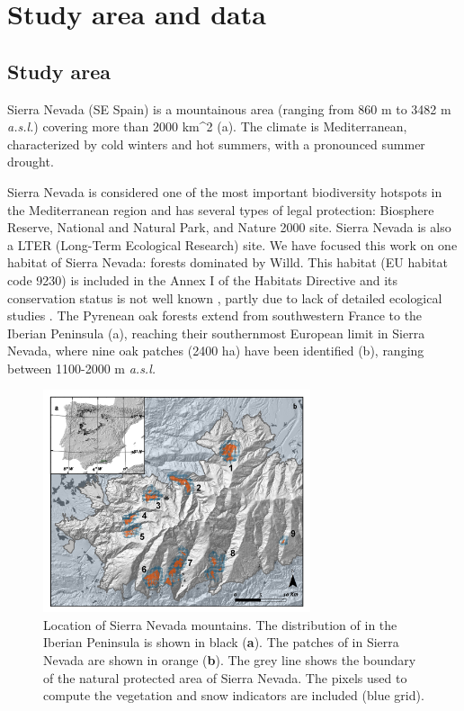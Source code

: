 \section{Study area and data}\label{sec:onto:MatMet}
\subsection{Study area}\label{sec:onto:StudyArea}

Sierra Nevada (SE Spain) is a mountainous area (ranging from 860 m to 3482 m \emph{a.s.l.}) covering more than 2000 km\^{}2 (a). The climate is Mediterranean, characterized by cold winters and hot summers, with a pronounced summer drought.

Sierra Nevada is considered one of the most important biodiversity hotspots in the Mediterranean region \autocite{Blancaetal1998ThreatenedVascular} and has several types of legal protection: Biosphere Reserve, National and Natural Park, and Nature 2000 site. Sierra Nevada is also a LTER (Long-Term Ecological Research) site.
We have focused this work on one habitat of Sierra Nevada: forests dominated by \Qpy Willd. This habitat (EU habitat code 9230) is included in the Annex I of the Habitats Directive and its conservation status is not well known \autocite{EIONET2013OnlineReport}, partly due to lack of detailed ecological studies \autocite{GarciaJimenez20099230Robledales}. The Pyrenean oak forests extend from southwestern France to the Iberian Peninsula \autocite{Franco1990Quercus} (a), reaching their southernmost European limit in Sierra Nevada, where nine oak patches (2400 ha) have been identified (b), ranging between 1100-2000 m \emph{a.s.l.}
\begin{figure}
    \centering
    \includegraphics[width=0.7\textwidth]{img/onto/onto-location}\caption{Location of Sierra Nevada mountains. The distribution of \Qpy in the Iberian Peninsula is shown in black (\textbf{a}). The patches of \Qpy in Sierra Nevada are shown in orange (\textbf{b}). The grey line shows the boundary of the natural protected area of Sierra Nevada. The pixels used to compute the vegetation and snow indicators are included (blue grid).}\label{fig:locate}
\end{figure}

